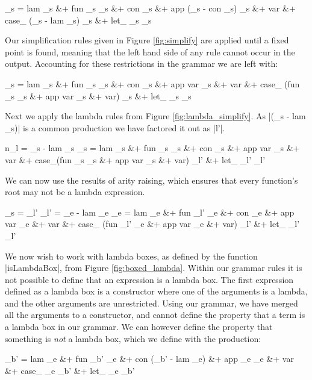 \documentclass[preprint]{sigplanconf}
\begin{document}
\begin{code}
_s  =  lam _s &+ fun _s _s &+ con _s &+ app (_s - con _s) _s &+ var &+
       case_ (_s - lam _s) _s &+ let_ _s _s
\end{code}

Our simplification rules given in Figure \ref{fig:simplify} are applied until a fixed point is found, meaning that the left hand side of any rule cannot occur in the output. Accounting for these restrictions in the grammar we are left with:

\begin{code}
_s  =  lam _s &+ fun _s _s &+ con _s &+ app var _s &+ var &+
       case_ (fun _s _s &+ app var _s &+ var) _s &+ let_ _s _s
\end{code}

Next we apply the lambda rules from Figure \ref{fig:lambda_simplify}. As |(_s - lam _s)| is a common production we have factored it out as |l'|.

\begin{code}
n_l  =  _s - lam _s
_s   =  lam _s &+ fun _s _s &+ con _s &+ app var _s &+ var &+
        case_(fun _s _s &+ app var _s &+ var) _l' &+ let_ _l' _l'
\end{code}

We can now use the results of arity raising, which ensures that every function's root may not be a lambda expression.

\begin{code}
_s   = _l'
_l' = _e - lam _e
_e =  lam _e &+ fun _l' _e &+ con _e &+ app var _e &+ var &+
      case_ (fun _l' _e &+ app var _e &+ var) _l' &+ let_ _l' _l'
\end{code}

We now wish to work with lambda boxes, as defined by the function |isLambdaBox|, from Figure \ref{fig:boxed_lambda}. Within our grammar rules it is not possible to define that an expression is a lambda box. The first expression defined as a lambda box is a constructor where one of the arguments is a lambda, and the other arguments are unrestricted. Using our grammar, we have merged all the arguments to a constructor, and cannot define the property that a term is a lambda box in our grammar. We can however define the property that something is \textit{not} a lambda box, which we define with the production:

%
\begin{code}
_b'  =  lam _e &+ fun _b' _e &+ con (_b' - lam _e) &+ app _e _e &+ var &+
        case_ _e _b' &+ let_ _e _b'
\end{code}
\end{document}
